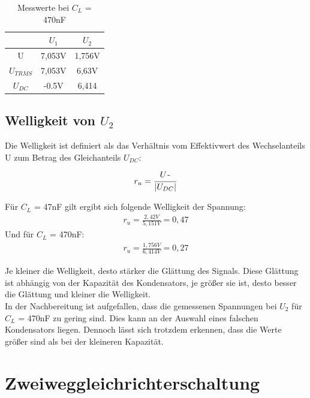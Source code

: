 \documentclass{article}
\begin{document}
\begin{table}[h]
  \begin{center}
\begin{tabular}{|c|c|c|}
  \hline
  & $U_{1}$ & $U_{2}$  \\
  \hline
  U\raisebox{-0.9ex}{\~{}} & 7,053V & 1,756V\\
  \hline
  $U_{TRMS}$ & 7,053V & 6,63V\\
  \hline
  $U_{DC}$ & -0.5V  & 6,414\\
  \hline
\end{tabular}
\caption{Messwerte bei $C_L$ = 470nF}
\end{center}
\end{table}

\subsection{Welligkeit von $U_2$}

Die Welligkeit ist definiert als das Verhältnis vom Effektivwert des Wechselanteils U\raisebox{-0.9ex}{\~{}} zum Betrag des Gleichanteils $U_{DC}$:

\begin{align*}
  r_u = \frac{U\raisebox{-0.9ex}{\~{}}}{|U_{DC}|}
\end{align*}

Für $C_L$ = 47nF gilt ergibt sich folgende Welligkeit der Spannung:
\begin{align*}
  r_u = \frac{2,42V}{5,151V} = 0,47
\end{align*}
Und für $C_L$ = 470nF:
\begin{align*}
  r_u = \frac{1,756V}{6,414V} = 0,27
\end{align*}

Je kleiner die Welligkeit, desto stärker die Glättung des Signals. Diese Glättung ist abhängig von der Kapazität des Kondensators, je größer sie ist, desto besser die Glättung und kleiner die Welligkeit.
\\ In der Nachbereitung ist aufgefallen, dass die gemessenen Spannungen bei $U_2$ für $C_L$ = 470nF zu gering sind. Dies kann an der Auswahl eines falschen Kondensators liegen.
Dennoch lässt sich trotzdem erkennen, dass die Werte größer sind als bei der kleineren Kapazität.

\section{Zweiweggleichrichterschaltung}
\end{document}
